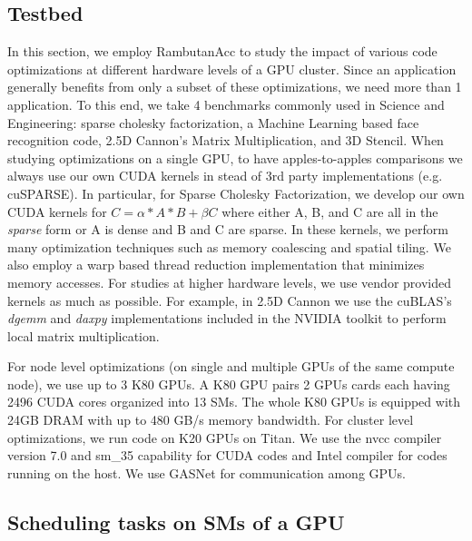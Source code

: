 \subsection{Testbed}
In this section, we employ RambutanAcc to study the impact of various code optimizations at different hardware levels of a GPU cluster.
Since an application generally benefits from only a subset of these optimizations, we need more than 1 application.
To this end, we take 4 benchmarks commonly used in Science and Engineering: sparse cholesky factorization, a Machine Learning based face recognition code, 2.5D Cannon's Matrix Multiplication, and 3D Stencil.
When studying optimizations on a single GPU, to have apples-to-apples comparisons we always use our own CUDA kernels in stead of 3rd party implementations (e.g. cuSPARSE). 
In particular, for Sparse Cholesky Factorization, we develop our own CUDA kernels for $C = \alpha* A * B + \beta C$ where either A, B, and C are all in the {\em sparse} form or A is dense and B and C are sparse.
In these kernels, we perform many optimization techniques such as memory coalescing and spatial tiling.
We also employ a warp based thread reduction implementation that minimizes memory accesses. 
For studies at higher hardware levels, we use vendor provided kernels as much as possible.
For example, in  2.5D Cannon we use the cuBLAS's {\em dgemm} and {\em daxpy} implementations included in the NVIDIA toolkit to perform local matrix multiplication.

For node level optimizations (on single and multiple GPUs of the same compute node), we use up to 3 K80 GPUs.
A K80 GPU pairs 2 GPUs cards each having 2496 CUDA cores organized into 13 SMs.
The whole K80 GPUs is equipped with 24GB DRAM with up to 480 GB/s memory bandwidth.
For cluster level optimizations, we run code on K20 GPUs on Titan.
We use the nvcc compiler version 7.0 and sm\_35 capability for CUDA codes and Intel compiler for codes running on the host.
We use GASNet for communication among GPUs. 


\subsection{Scheduling tasks on SMs of a GPU}

